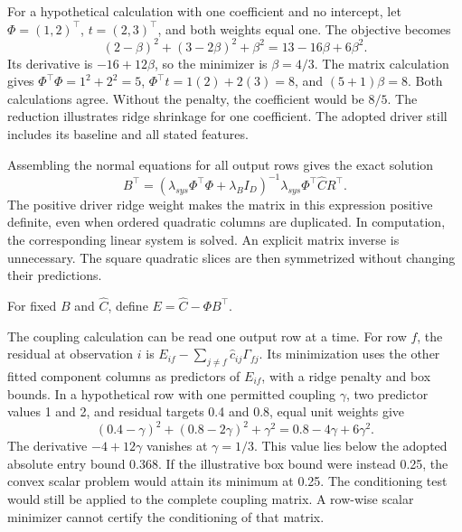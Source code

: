 For a hypothetical calculation with one coefficient and no intercept, let \(\Phi=(1,2)^\top\), \(t=(2,3)^\top\), and both weights equal one. The objective becomes
\begin{equation}
\label{eq:icsor_ridge_numeric_example}
(2-\beta)^2+(3-2\beta)^2+\beta^2
=13-16\beta+6\beta^2.
\end{equation}
Its derivative is \(-16+12\beta\), so the minimizer is \(\beta=4/3\). The matrix calculation gives \(\Phi^\top\Phi=1^2+2^2=5\), \(\Phi^\top t=1(2)+2(3)=8\), and \((5+1)\beta=8\). Both calculations agree. Without the penalty, the coefficient would be \(8/5\). The reduction illustrates ridge shrinkage for one coefficient. The adopted driver still includes its baseline and all stated features.

Assembling the normal equations for all output rows gives the exact solution
\begin{equation}
\label{eq:icsor_ridge_update}
B^\top=
\left(\lambda_{sys}\Phi^\top\Phi+\lambda_B I_D\right)^{-1}
\lambda_{sys}\Phi^\top\widehat C R^\top.
\end{equation}
The positive driver ridge weight makes the matrix in this expression positive definite, even when ordered quadratic columns are duplicated. In computation, the corresponding linear system is solved. An explicit matrix inverse is unnecessary. The square quadratic slices are then symmetrized without changing their predictions.

For fixed \(B\) and \(\widehat C\), define \(E=\widehat C-\Phi B^\top\).

The coupling calculation can be read one output row at a time. For row \(f\), the residual at observation \(i\) is \(E_{if}-\sum_{j\neq f}\widehat c_{ij}\Gamma_{fj}\). Its minimization uses the other fitted component columns as predictors of \(E_{if}\), with a ridge penalty and box bounds. In a hypothetical row with one permitted coupling \(\gamma\), two predictor values 1 and 2, and residual targets 0.4 and 0.8, equal unit weights give
\begin{equation}
\label{eq:icsor_coupling_numeric_update}
(0.4-\gamma)^2+(0.8-2\gamma)^2+\gamma^2
=0.8-4\gamma+6\gamma^2.
\end{equation}
The derivative \(-4+12\gamma\) vanishes at \(\gamma=1/3\). This value lies below the adopted absolute entry bound 0.368. If the illustrative box bound were instead 0.25, the convex scalar problem would attain its minimum at 0.25. The conditioning test would still be applied to the complete coupling matrix. A row-wise scalar minimizer cannot certify the conditioning of that matrix.

